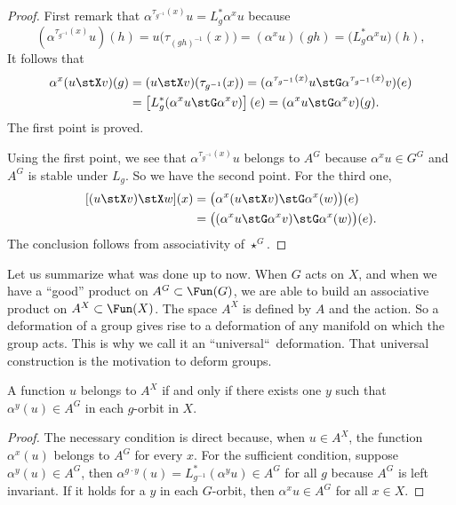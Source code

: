 \begin{proof}
First remark that $\alpha^{\tau_{g^{-1}}(x)}u=L^*_g\alpha^xu$ because
\[ 
(\alpha^{\tau_{g^{-1}}(x)}u)(h)=u\big(\tau_{(gh)^{-1}}(x)\big)=(\alpha^xu)(gh)
=\big(L^*_g\alpha^xu\big)(h),
\]
It follows that
\begin{equation}
\begin{split}
\alpha^x(u\stX v)(g)&=(u\stX v)(\tau_{g^{-1}}(x))
                    =(\alpha^{\tau_{g^{-1}}(x)}u\stG\alpha^{\tau_{g^{-1}}(x)}v) (e)\\
            &=\left[ L^*_g(\alpha^xu\stG\alpha^xv) \right](e)
            =(\alpha^xu\stG\alpha^xv)(g).
\end{split}
\end{equation}
The first point is proved.

Using the first point, we see that $\alpha^{\tau_{g^{-1}}(x)}u$ belongs to $A^G$ because $\alpha^xu\in G^G$ and $A^G$ is stable under $L_g$. So we have the second point.  For the third one,
\[ 
\begin{split}
[(u\stX v)\stX w](x)&=\big(\alpha^x(u\stX v)\stG\alpha^x(w)\big)(e)\\
                    &=\big((\alpha^xu\stG\alpha^xv)\stG\alpha^x(w)\big)(e).
\end{split}
\]
The conclusion follows from associativity of $\star^G$.
\end{proof}

Let us summarize what was done up to now. When $G$ acts on $X$, and when we have a ``good'' product on $A^G\subset\Fun(G)$, we are able to build an associative product on $A^X\subset\Fun(X)$. The space $A^X$ is defined by $A$ and the action. So a deformation of a group gives rise to a deformation of any manifold on which the group acts. This is why we call it an ``universal``\ deformation. That universal construction is the motivation to deform groups.

\begin{lemma}   
A function $u$ belongs to $A^{X}$ if and only if there exists one $y$ such that $\alpha^y(u)\in A^G$ in each $g$-orbit in $X$.
        \label{LemUnPtParOrbite}
\end{lemma}

\begin{proof}
The necessary condition is direct because, when $u\in A^X$, the function $\alpha^x(u)$ belongs to $A^G$ for every $x$. For the sufficient condition, suppose $\alpha^y(u)\in A^{G}$, then $\alpha^{g\cdot y}(u)=L_{g^{-1}}^*(\alpha^yu)\in A^{G}$ for all $g$ because $A^{G}$ is left invariant. If it holds for a $y$ in each $G$-orbit, then $\alpha^xu\in A^{G}$ for all $x\in X$.
\end{proof}

